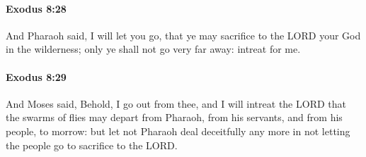 		\paragraph{Exodus 8:28} %
			\label{EXODUS-8-28}

			And Pharaoh said, I will let you go, that ye may sacrifice to the LORD your God in the wilderness; only ye shall not go very far away: intreat for me.


		\paragraph{Exodus 8:29} %
			\label{EXODUS-8-29}

			And Moses said, Behold, I go out from thee, and I will intreat the LORD that the swarms of flies may depart from Pharaoh, from his servants, and from his people, to morrow: but let not Pharaoh deal deceitfully any more in not letting the people go to sacrifice to the LORD.

